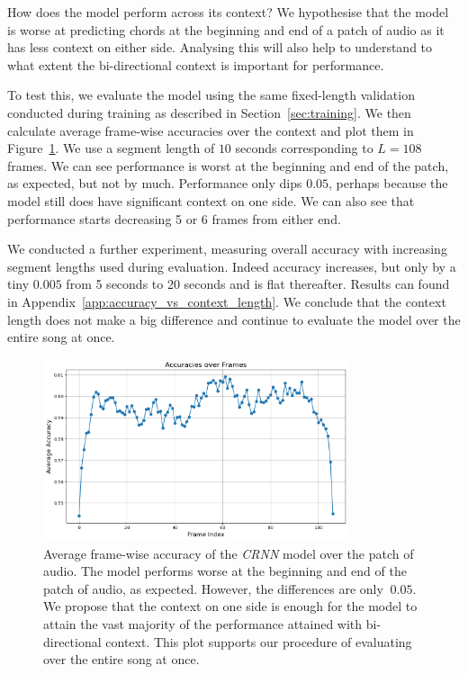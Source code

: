 How does the model perform across its context? We hypothesise that the model is worse at predicting chords at the beginning and end of a patch of audio as it has less context on either side. Analysing this will also help to understand to what extent the bi-directional context is important for performance.

To test this, we evaluate the model using the same fixed-length validation conducted during training as described in Section~\ref{sec:training}. We then calculate average frame-wise accuracies over the context and plot them in Figure~\ref{fig:crnn_context}. We use a segment length of $10$ seconds corresponding to $L=108$ frames. We can see performance is worst at the beginning and end of the patch, as expected, but not by much. Performance only dips $0.05$, perhaps because the model still does have significant context on one side. We can also see that performance starts decreasing 5 or 6 frames from either end.

We conducted a further experiment, measuring overall accuracy with increasing segment lengths used during evaluation. Indeed accuracy increases, but only by a tiny $0.005$ from 5 seconds to 20 seconds and is flat thereafter. Results can found in Appendix~\ref{app:accuracy_vs_context_length}. We conclude that the context length does not make a big difference and continue to evaluate the model over the entire song at once.

\begin{figure}[H]
    \centering
    \includegraphics[width=0.8\textwidth]{figures/accuracy_over_frames.png}
    \caption{Average frame-wise accuracy of the \emph{CRNN} model over the patch of audio. The model performs worse at the beginning and end of the patch of audio, as expected. However, the differences are only $~0.05$. We propose that the context on one side is enough for the model to attain the vast majority of the performance attained with bi-directional context. This plot supports our procedure of evaluating over the entire song at once. }\label{fig:crnn_context}
\end{figure}

